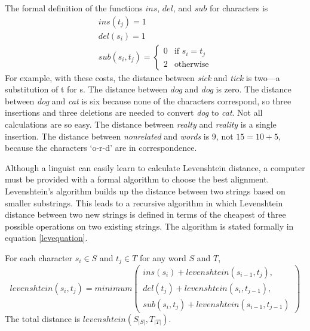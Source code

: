 \documentclass[11pt]{article}
\begin{document}
The formal definition of the functions $ins$, $del$, and $sub$
for characters is
\begin{equation}
\begin{array}{l}
   ins(t_j) = 1 \\
   del(s_i) = 1 \\
   sub(s_i,t_j) = \left\{
     \begin{array}{ll}
       0 & \textrm{if $s_i=t_j$} \\
       2 & \textrm{otherwise}
     \end{array} \right.

   \end{array}
\end{equation}
For example, with these costs, the distance between \textit{sick} and
\textit{tick} is two---a substitution of t for s. The distance between
\textit{dog} and \textit{dog} is zero. The distance between
\textit{dog} and \textit{cat} is six because none of the characters
correspond, so three insertions and three deletions are needed to
convert \textit{dog} to \textit{cat}. Not all calculations are so
easy. The distance between \textit{realty} and \textit{reality} is a
single insertion. The distance between \textit{nonrelated} and
\textit{words} is 9, not $15 =10 + 5$, because the characters `o-r-d'
are in correspondence.

Although a linguist can easily learn to calculate Levenshtein distance,
a computer must be provided with a formal algorithm to choose
the best alignment. Levenshtein's algorithm
builds up the distance between two strings based on smaller
substrings.  This leads to a recursive algorithm in which Levenshtein
distance between two new strings is defined in terms of the cheapest of
three possible operations on two existing strings. The algorithm is
stated formally in equation \ref{levequation}.

For each character $s_i \in S$ and $t_j \in T$ for any word $S$ and $T$,
\begin{equation}
  levenshtein(s_i,t_j) = minimum \left(
  \begin{array}{l}
   ins(s_i)+levenshtein(s_{i-1},t_j), \\
 del(t_j)+levenshtein(s_i,t_{j-1}), \\
 sub(s_i,t_j)+levenshtein(s_{i-1},t_{j-1})
   \end{array} \right)
   \label{levequation}
\end{equation}
The total distance is $levenshtein(S_{|S|},T_{|T|})$.
\end{document}
